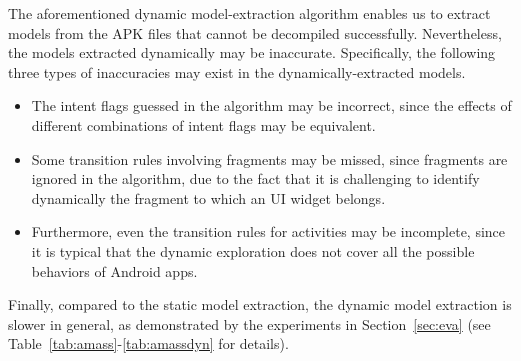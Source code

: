 The aforementioned dynamic model-extraction algorithm enables us to extract models from the APK files that cannot be decompiled successfully. 
Nevertheless, the models extracted dynamically may be inaccurate. Specifically, the following three types of inaccuracies may exist in the dynamically-extracted models.
\begin{itemize}
\item The intent flags guessed in the algorithm may be incorrect, since the effects of different combinations of intent flags may be equivalent.
%
\item Some transition rules involving fragments may be missed, since fragments are ignored in the algorithm, due to the fact that it is challenging to identify dynamically the fragment to which an UI widget belongs.
%
\item Furthermore, even the transition rules for activities may be incomplete, since it is typical that the dynamic exploration does not cover all the possible behaviors of Android apps.    
\end{itemize}
Finally, compared to the static model extraction, the dynamic model extraction is slower in general, as demonstrated by the experiments in Section~\ref{sec:eva} (see Table~\ref{tab:amass}-\ref{tab:amassdyn} for details).


